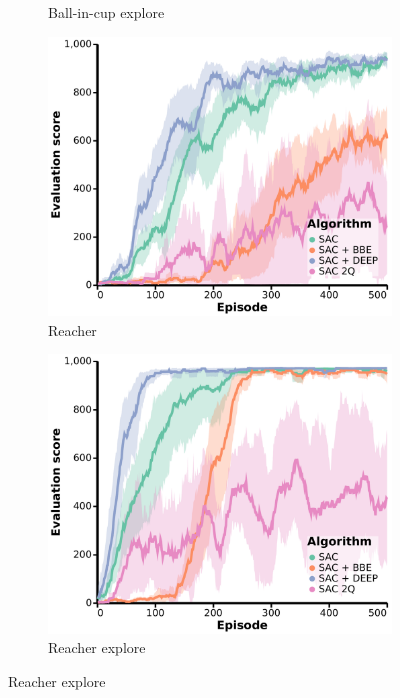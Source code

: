 \begin{subappendices}
\begin{figure}[h]
\begin{subfigure}[b]{0.24\textwidth}
        \caption{Ball-in-cup explore}
    \end{subfigure}
    \hfill
    \begin{subfigure}[b]{0.24\textwidth}
        \centering
        \includegraphics[width=\textwidth]{figures/deep/neurips_SAC2Q_reacher.pdf}
        \caption{Reacher}
    \end{subfigure}
    \begin{subfigure}[b]{0.24\textwidth}
        \centering
        \includegraphics[width=\textwidth]{figures/deep/neurips_SAC2Q_reacher_explore.pdf}
        \caption{Reacher explore}
    \end{subfigure}
    \vspace{1em}


\end{figure}
\end{subappendices}
